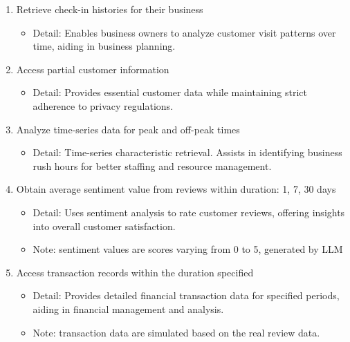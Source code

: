 \documentclass[runningheads]{llncs}
\begin{document}
\begin{enumerate}

    \item Retrieve check-in histories for their business

    \begin{itemize}
        \item[\textbullet] Detail: Enables business owners to analyze customer visit patterns over time, aiding in business planning.
    \end{itemize}
    
    \item Access partial customer information

    \begin{itemize}
        \item[\textbullet] Detail: Provides essential customer data while maintaining strict adherence to privacy regulations.
    \end{itemize}


    \item Analyze time-series data for peak and off-peak times
    
   \begin{itemize}
        \item[\textbullet] Detail: Time-series characteristic retrieval. Assists in identifying business rush hours for better staffing and resource management.
    \end{itemize}
    

    \item Obtain average sentiment value from reviews within duration: 1, 7, 30 days
    
    \begin{itemize}
        \item[\textbullet] Detail: Uses sentiment analysis to rate customer reviews, offering insights into overall customer satisfaction. 
        \item[\textbullet] Note: sentiment values are scores varying from 0 to 5, generated by LLM
    \end{itemize}

    \item Access transaction records within the duration specified
    
    \begin{itemize}
        \item[\textbullet] Detail: Provides detailed financial transaction data for specified periods, aiding in financial management and analysis. 
        \item[\textbullet] Note: transaction data are simulated based on the real review data.
    \end{itemize}

\end{enumerate}
\end{document}
